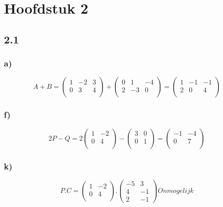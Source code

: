 \documentclass[11pt]{article}
\begin{document}
\section*{Hoofdstuk 2}
\subsection*{2.1}
\subsubsection*{a)}
\[
A+B=
\begin{pmatrix}
  1 & -2 & 3 \\
  0 & 3 & 4 \\
 \end{pmatrix}
 +
\begin{pmatrix}
  0 & 1 & -4 \\
  2 & -3 & 0 \\
 \end{pmatrix}
 =
 \begin{pmatrix}
  1 & -1 & -1 \\
  2 & 0 & 4 \\
 \end{pmatrix}
\]
\subsubsection*{f)}
\[
2P-Q=2
\begin{pmatrix}
  1 & -2 \\
  0 & 4 \\
 \end{pmatrix}
 -
\begin{pmatrix}
  3 & 0 \\
  0 & 1 \\
 \end{pmatrix}
 =
 \begin{pmatrix}
  -1 & -4 \\
  0 & 7 \\
 \end{pmatrix}
\]
\subsubsection*{k)}
\[
P.C=
\begin{pmatrix}
  1 & -2 \\
  0 & 4 \\
 \end{pmatrix}
 .
\begin{pmatrix}
  -5 & 3 \\
  4 & -1 \\
  2 & -1
 \end{pmatrix}
 Onmogelijk
\]
\end{document}
